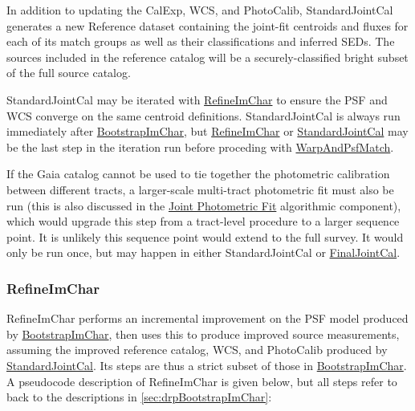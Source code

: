 In addition to updating the CalExp, WCS, and PhotoCalib, StandardJointCal generates a new Reference dataset containing the joint-fit centroids and fluxes for each of its match groups as well as their classifications and inferred SEDs.  The sources included in the reference catalog will be a securely-classified bright subset of the full source catalog.

StandardJointCal may be iterated with \hyperref[sec:drpRefineImChar]{RefineImChar} to ensure the PSF and WCS converge on the same centroid definitions.  StandardJointCal is always run immediately after \hyperref[sec:drpBootstrapImChar]{BootstrapImChar}, but \hyperref[sec:drpRefineImChar]{RefineImChar} or \hyperref[sec:drpStandardJointCal]{StandardJointCal} may be the last step in the iteration run before proceding with \hyperref[sec:drpWarpAndPsfMatch]{WarpAndPsfMatch}.

If the Gaia catalog cannot be used to tie together the photometric calibration between different tracts, a larger-scale multi-tract photometric fit must also be run (this is also discussed in the \hyperref[sec:acJointPhotometricFit]{Joint Photometric Fit} algorithmic component), which would upgrade this step from a tract-level procedure to a larger sequence point.  It is unlikely this sequence point would extend to the full survey.  It would only be run once, but may happen in either StandardJointCal or \hyperref[sec:drpFinalJointCal]{FinalJointCal}.

\subsubsection{RefineImChar}
\label{sec:drpRefineImChar}

RefineImChar performs an incremental improvement on the PSF model produced by \hyperref[sec:drpBootstrapImChar]{BootstrapImChar}, then uses this to produce improved source measurements, assuming the improved reference catalog, WCS, and PhotoCalib produced by \hyperref[sec:drpStandardJointCal]{StandardJointCal}.  Its steps are thus a strict subset of those in \hyperref[sec:drpBootstrapImChar]{BootstrapImChar}.  A pseudocode description of RefineImChar is given below, but all steps refer to back to the descriptions in \ref{sec:drpBootstrapImChar}:

\newcommand{\hr}[1]{\hyperref[sec:drpBootstrapImChar_#1]{#1}}

